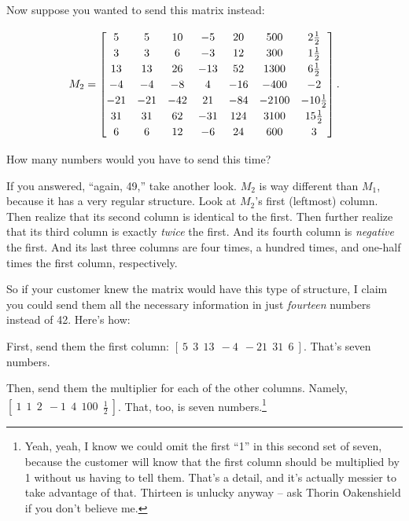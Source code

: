 \begin{alttitles}
Now suppose you wanted to send this matrix instead:

\vspace{-.15in}
\begin{align*}
M_2 = 
\begingroup
\renewcommand*{\arraystretch}{1.2}
\begin{bmatrix}
5 & 5 & 10 & -5 & 20 & 500 & 2\frac{1}{2} \\
3 & 3 & 6 & -3 & 12 & 300 & 1\frac{1}{2} \\
13 & 13 & 26 & -13 & 52 & 1300 & 6\frac{1}{2} \\
-4 & -4 & -8 & 4 & -16 & -400 & -2 \\
-21 & -21 & -42 & 21 & -84 & -2100 & -10\frac{1}{2} \\
31 & 31 & 62 & -31 & 124 & 3100 & 15\frac{1}{2} \\
6 & 6 & 12 & -6 & 24 & 600 & 3 \\
\end{bmatrix}.
\endgroup
\end{align*}
\vspace{-.15in}

How many numbers would you have to send this time?

If you answered, ``again, 49,'' take another look. $M_2$ is way different than
$M_1$, because it has a very regular structure. Look at $M_2$'s first
(leftmost) column. Then realize that its second column is identical to the
first. Then further realize that its third column is exactly \textit{twice} the
first. And its fourth column is \textit{negative} the first. And its last three
columns are four times, a hundred times, and one-half times the first column,
respectively.

So if your customer knew the matrix would have this type of structure, I claim
you could send them all the necessary information in just \textit{fourteen}
numbers instead of 42. Here's how:

\begin{compactenum}
\item First, send them the first column: $[\ 5\ \ 3\ \ 13\ \ -4\ \ -21\ \ 31\ \
6\ ]$. That's seven numbers.
\item Then, send them the multiplier for each of the other columns. Namely, $[\
1\ \ 1\ \ 2\ \ -1\ \ 4\ \ 100\ \ \frac{1}{2}\ ]$. That, too, is seven
numbers.\footnote{Yeah, yeah, I know we could omit the first ``1'' in this
second set of seven, because the customer will know that the first column
should be multiplied by 1 without us having to tell them. That's a detail, and
it's actually messier to take advantage of that. Thirteen is unlucky anyway --
ask Thorin Oakenshield if you don't believe me.}


\end{compactenum}
\end{alttitles}
